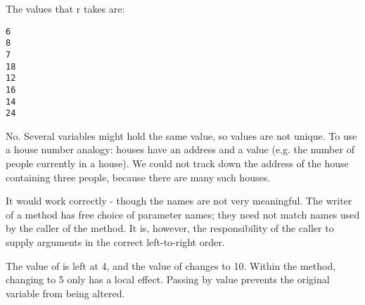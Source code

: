 \begin{stab}
\begin{enumChapter}
				\item The values that r takes are:
					\begin{lstlisting}
6
8
7
18
12
16
14
24
					\end{lstlisting}
				\item No. Several variables might hold the same value, so values are not unique. To use a house number analogy: houses have an address and a value (e.g. the number of people currently in a house). We could not track down the address of the house containing three people, because there are many such houses.
				\item It would work correctly - though the names are not very meaningful. The writer of a method has free choice of parameter names; they need not match names used by the caller of the method. It is, however, the responsibility of the caller to supply arguments in the correct left-to-right order.
				\item	The value of  is left at 4, and the value of  changes to 10. Within the method, changing  to 5 only has a local effect. Passing by value prevents the original variable  from being altered.
			\end{enumChapter}
		\end{stab}



